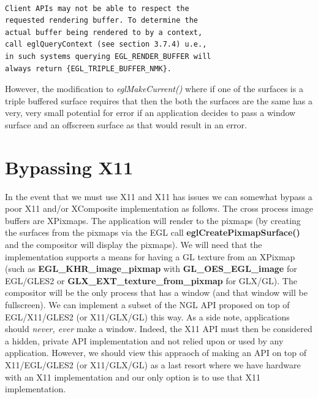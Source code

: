 \documentclass[a4paper,11pt]{article}
\begin{document}
\begin{indenter}{2cm}
\begin{indenter}{0.5cm}
\begin{verbatim}

Client APIs may not be able to respect the 
requested rendering buffer. To determine the 
actual buffer being rendered to by a context, 
call eglQueryContext (see section 3.7.4) u.e., 
in such systems querying EGL_RENDER_BUFFER will 
always return {EGL_TRIPLE_BUFFER_NMK}.  
\end{verbatim}
\end{indenter}


However, the modification to \textit{eglMakeCurrent()} where if one of the surfaces is a triple buffered surface requires that then the both the surfaces are the same has a very, very small potential for error if an application decides to pass a window surface and an offscreen surface as that would result in an error.

\end{indenter}

\section{Bypassing X11}
In the event that we must use X11 and X11 has issues we can somewhat bypass
a poor X11 and/or XComposite implementation as follows. The cross process 
image buffers are XPixmaps. The application will render to the pixmaps 
(by creating the surfaces from the pixmaps via the EGL call 
\textbf{eglCreatePixmapSurface()} and the compositor will display the pixmaps). 
We will need that the implementation supports a means for having a GL texture from an 
XPixmap (such as \textbf{EGL\_KHR\_image\_pixmap}  with \textbf{GL\_OES\_EGL\_image}
for EGL/GLES2 or \textbf{GLX\_EXT\_texture\_from\_pixmap} for GLX/GL). The compositor
will be the only process that has a window (and that window will be fullscreen).
We can implement a subset of the NGL API proposed on top of EGL/X11/GLES2
(or X11/GLX/GL) this way. As a side note, applications should \textit{never, ever} make
a window. Indeed, the X11 API must then be considered a hidden, private
API implementation and not relied upon or used by any application. However, 
we should view this appraoch of making an API on top of X11/EGL/GLES2 (or X11/GLX/GL) 
as a last resort where we have hardware with an X11 implementation and our only option 
is to use that X11 implementation.
\end{document}
